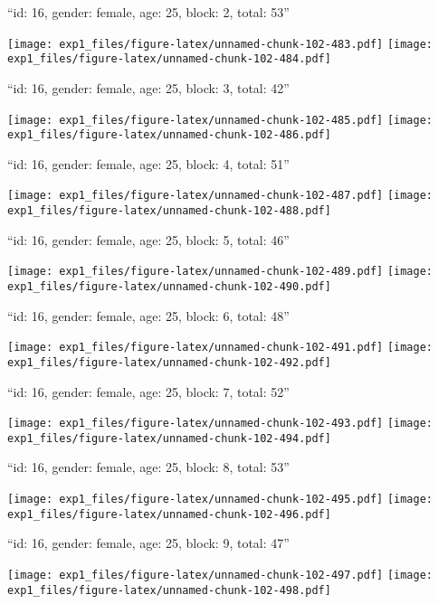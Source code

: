\documentclass[11pt,,]{article}
\begin{document}
\newpage
[1] 

``id: 16, gender: female, age: 25, block: 2, total: 53''

\texttt{[image: exp1\_files/figure-latex/unnamed-chunk-102-483.pdf]}
\texttt{[image: exp1\_files/figure-latex/unnamed-chunk-102-484.pdf]}

\newpage
[1] 

``id: 16, gender: female, age: 25, block: 3, total: 42''

\texttt{[image: exp1\_files/figure-latex/unnamed-chunk-102-485.pdf]}
\texttt{[image: exp1\_files/figure-latex/unnamed-chunk-102-486.pdf]}

\newpage
[1] 

``id: 16, gender: female, age: 25, block: 4, total: 51''

\texttt{[image: exp1\_files/figure-latex/unnamed-chunk-102-487.pdf]}
\texttt{[image: exp1\_files/figure-latex/unnamed-chunk-102-488.pdf]}

\newpage
[1] 

``id: 16, gender: female, age: 25, block: 5, total: 46''

\texttt{[image: exp1\_files/figure-latex/unnamed-chunk-102-489.pdf]}
\texttt{[image: exp1\_files/figure-latex/unnamed-chunk-102-490.pdf]}

\newpage
[1] 

``id: 16, gender: female, age: 25, block: 6, total: 48''

\texttt{[image: exp1\_files/figure-latex/unnamed-chunk-102-491.pdf]}
\texttt{[image: exp1\_files/figure-latex/unnamed-chunk-102-492.pdf]}

\newpage
[1] 

``id: 16, gender: female, age: 25, block: 7, total: 52''

\texttt{[image: exp1\_files/figure-latex/unnamed-chunk-102-493.pdf]}
\texttt{[image: exp1\_files/figure-latex/unnamed-chunk-102-494.pdf]}

\newpage
[1] 

``id: 16, gender: female, age: 25, block: 8, total: 53''

\texttt{[image: exp1\_files/figure-latex/unnamed-chunk-102-495.pdf]}
\texttt{[image: exp1\_files/figure-latex/unnamed-chunk-102-496.pdf]}

\newpage
[1] 

``id: 16, gender: female, age: 25, block: 9, total: 47''

\texttt{[image: exp1\_files/figure-latex/unnamed-chunk-102-497.pdf]}
\texttt{[image: exp1\_files/figure-latex/unnamed-chunk-102-498.pdf]}
\end{document}
